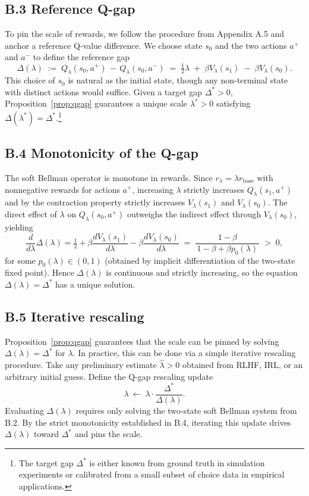 \subsection*{B.3 Reference Q-gap}

To pin the scale of rewards, we follow the procedure from Appendix A.5 and anchor a reference Q-value difference. We choose state $s_0$ and the two actions $a^+$ and $a^-$ to define the reference gap
\[
\Delta(\lambda)\;:=\;Q_\lambda(s_0,a^+)\,-\,Q_\lambda(s_0,a^-)
\;=\;\tfrac{1}{2}\lambda\;+\;\beta V_\lambda(s_1)\;-\;\beta V_\lambda(s_0).
\]
This choice of $s_0$ is natural as the initial state, though any non-terminal state with distinct actions would suffice. Given a target gap $\Delta^{\ast}>0$, Proposition~\ref{prop:qgap} guarantees a unique scale $\lambda^{\ast}>0$ satisfying $\Delta(\lambda^{\ast})=\Delta^{\ast}$.\footnote{\footnotesize The target gap $\Delta^{\ast}$ is either known from ground truth in simulation experiments or calibrated from a small subset of choice data in empirical applications.}

\subsection*{B.4 Monotonicity of the Q-gap}

The soft Bellman operator is monotone in rewards. Since $r_\lambda=\lambda r_{\text{base}}$ with nonnegative rewards for actions $a^+$, increasing $\lambda$ strictly increases $Q_\lambda(s_1,a^+)$ and by the contraction property strictly increases $V_\lambda(s_1)$ and $V_\lambda(s_0)$. The direct effect of $\lambda$ on $Q_\lambda(s_0,a^+)$ outweighs the indirect effect through $V_\lambda(s_0)$, yielding
\[
\frac{d}{d\lambda}\Delta(\lambda)
=\tfrac12+\beta\frac{dV_\lambda(s_1)}{d\lambda}-\beta\frac{dV_\lambda(s_0)}{d\lambda}
\;=\;\frac{1-\beta}{\,1-\beta+\beta p_0(\lambda)\,}\;>\;0,
\]
for some $p_0(\lambda)\in(0,1)$ (obtained by implicit differentiation of the two-state fixed point). Hence $\Delta(\lambda)$ is continuous and strictly increasing, so the equation $\Delta(\lambda)=\Delta^{\ast}$ has a unique solution.

\subsection*{B.5 Iterative rescaling}
Proposition~\ref{prop:qgap} guarantees that the scale can be pinned by solving $\Delta(\lambda)=\Delta^{\ast}$ for $\lambda$. In practice, this can be done via a simple iterative rescaling procedure. Take any preliminary estimate $\hat\lambda>0$ obtained from RLHF, IRL, or an arbitrary initial guess. Define the Q-gap rescaling update
\[
\lambda\ \leftarrow\ \lambda\cdot \frac{\Delta^{\ast}}{\Delta(\lambda)}.
\]
Evaluating $\Delta(\lambda)$ requires only solving the two-state soft Bellman system from B.2. By the strict monotonicity established in B.4, iterating this update drives $\Delta(\lambda)$ toward $\Delta^{\ast}$ and pins the scale.

